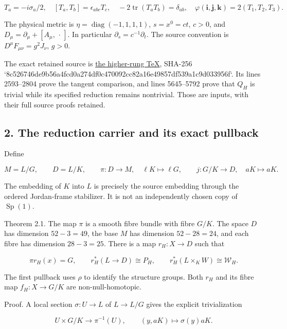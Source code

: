 \documentclass[11pt]{article}
\begin{document}
\[
 T_a=-i\sigma_a/2,\quad [T_a,T_b]=\epsilon_{abc}T_c,\quad
 -2\operatorname{tr}(T_aT_b)=\delta_{ab},\quad
 \varphi(\mathbf i,\mathbf j,\mathbf k)=2(T_1,T_2,T_3).
 \tag{HC2}
\]

The physical metric is \(\eta=\operatorname{diag}(-1,1,1,1)\),
\(s=x^0=ct\), \(c>0\), and \(D_\mu=\partial_\mu+[A_\mu,\,\cdot\,]\).
In particular \(\partial_s=c^{-1}\partial_t\). The source convention is
\(D^\mu F_{\mu\nu}=g^2J_\nu\), \(g>0\).

The exact retained source is
\href{https://github.com/KokunoYumeto/yang-mills-interacting-workbench/blob/main/yang-mills/continuations/20260930-s6-ns-moment-map-bridge/sources/higher_rung/s6_higher_rung_24d_preprint.tex}{the higher-rung TeX},
SHA-256 `8c526746de9b56a4fcd0a274df0c470092cc82a16e49857df539a1c9d033956f`.
Its lines 2593–2804 prove the tangent comparison, and lines 5645–5792
prove that \(Q_H\) is trivial while its specified reduction remains
nontrivial. Those are inputs, with their full source proofs retained.

\subsection*{2. The reduction carrier and its exact pullback}

Define

\[
 M=L/G,\qquad D=L/K,\qquad
 \pi:D\longrightarrow M,\quad \ell K\longmapsto\ell G,
 \qquad j:G/K\longrightarrow D,\quad aK\longmapsto aK.
 \tag{HC3}
\]

The embedding of \(K\) into \(L\) is precisely the source embedding through
the ordered Jordan-frame stabilizer. It is not an independently chosen
copy of \(\operatorname{Sp}(1)\).

Theorem 2.1. The map \(\pi\) is a smooth fibre bundle with fibre \(G/K\).
The space \(D\) has dimension \(52-3=49\), the base \(M\) has dimension
\(52-28=24\), and each fibre has dimension \(28-3=25\). There is a map
\(r_H:X\to D\) such that

\[
 \pi r_H(x)=G,\qquad
 r_H^*(L\to D)\cong P_H,
 \qquad r_H^*(L\times_K W)\cong\mathcal W_H.
 \tag{HC4}
\]

The first pullback uses \(\rho\) to identify the structure groups.
Both \(r_H\) and its fibre map \(f_H:X\to G/K\) are non-null-homotopic.

Proof. A local section \(\sigma:U\to L\) of \(L\to L/G\) gives
the explicit trivialization

\[
 U\times G/K\longrightarrow\pi^{-1}(U),\qquad
 (y,aK)\longmapsto\sigma(y)aK.
\]
\end{document}
